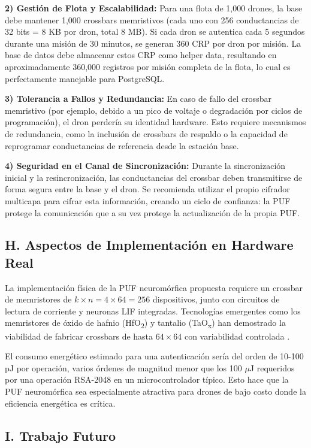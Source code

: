 \textbf{2) Gestión de Flota y Escalabilidad:} Para una flota de 1,000 drones, la base debe mantener 1,000 crossbars memristivos (cada uno con 256 conductancias de 32 bits = 8 KB por dron, total 8 MB). Si cada dron se autentica cada 5 segundos durante una misión de 30 minutos, se generan 360 CRP por dron por misión. La base de datos debe almacenar estos CRP como helper data, resultando en aproximadamente 360,000 registros por misión completa de la flota, lo cual es perfectamente manejable para PostgreSQL.

\textbf{3) Tolerancia a Fallos y Redundancia:} En caso de fallo del crossbar memristivo (por ejemplo, debido a un pico de voltaje o degradación por ciclos de programación), el dron perdería su identidad hardware. Esto requiere mecanismos de redundancia, como la inclusión de crossbars de respaldo o la capacidad de reprogramar conductancias de referencia desde la estación base.

\textbf{4) Seguridad en el Canal de Sincronización:} Durante la sincronización inicial y la resincronización, las conductancias del crossbar deben transmitirse de forma segura entre la base y el dron. Se recomienda utilizar el propio cifrador multicapa para cifrar esta información, creando un ciclo de confianza: la PUF protege la comunicación que a su vez protege la actualización de la propia PUF.

\subsection*{H. Aspectos de Implementación en Hardware Real}

La implementación física de la PUF neuromórfica propuesta requiere un crossbar de memristores de $k \times n = 4 \times 64 = 256$ dispositivos, junto con circuitos de lectura de corriente y neuronas LIF integradas. Tecnologías emergentes como los memristores de óxido de hafnio (HfO\textsubscript{2}) y tantalio (TaO\textsubscript{x}) han demostrado la viabilidad de fabricar crossbars de hasta $64 \times 64$ con variabilidad controlada \cite{rajan2020memristor}.

El consumo energético estimado para una autenticación sería del orden de 10-100 pJ por operación, varios órdenes de magnitud menor que los 100 $\mu$J requeridos por una operación RSA-2048 en un microcontrolador típico. Esto hace que la PUF neuromórfica sea especialmente atractiva para drones de bajo costo donde la eficiencia energética es crítica.

\subsection*{I. Trabajo Futuro}

